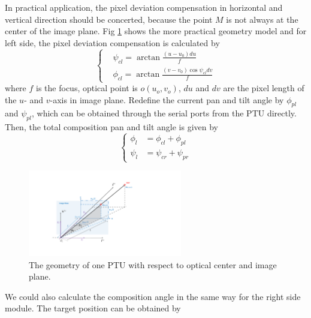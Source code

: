 In practical application, the pixel deviation compensation in horizontal and vertical direction should be concerted, because the point $M$ is not always at the center of the image plane. Fig \ref{fig:Fig02_ImagePlaneOnly} shows the more practical geometry model and for left side, the pixel deviation compensation is calculated by
\begin{equation} 
	\left \{
	\begin{split}
		& \psi_{cl} = \arctan \frac{(u-u_0)du}{f} \\
		& \phi_{cl} = \arctan \frac{(v-v_0)\cos\psi_{cl}dv}{f} 
	\end{split}
	\right.
\end{equation}
where $f$ is the focus, optical point is $o(u_o,v_o)$, $du$ and $dv$ are the pixel length of the $u$- and $v$-axis in image plane. Redefine the current pan and tilt angle by $\phi_{pl}$ and $\psi_{pl}$, which can be obtained through the serial ports from the PTU directly. Then, the total composition pan and tilt angle is given by
\begin{equation} 
	\left \{
	\begin{split}
		\phi_l &= \phi_{cl} + \phi_{pl} \\ 
		\psi_l &= \psi_{cr} + \psi_{pr}
	\end{split}
	\right.
\end{equation}

\begin{figure}[!th]
	\centering
	\includegraphics[width=0.6\textwidth]{Figs/chp03_vision_02_image_plane.pdf}
	\caption{The geometry of one PTU with respect to optical center and image plane.}
	\label{fig:Fig02_ImagePlaneOnly}
\end{figure}

We could also calculate the composition angle in the same way for the right side module. The target position can be obtained by

